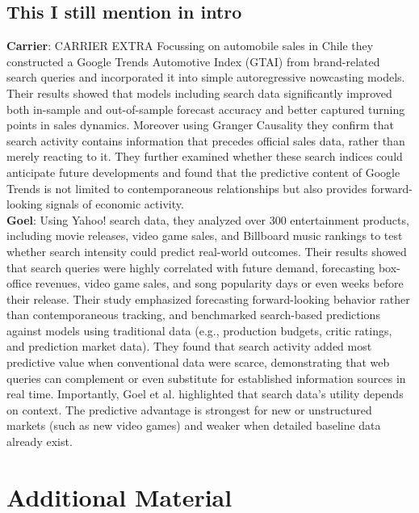 \documentclass[12pt,a4paper]{article}
\begin{document}
\subsection{This I still mention in intro}
\textbf{Carrier}: 
CARRIER EXTRA
Focussing on automobile sales in Chile they constructed a Google Trends Automotive Index (GTAI) from brand-related search queries and incorporated it into simple autoregressive nowcasting models.
Their results showed that models including search data significantly improved both in-sample and out-of-sample forecast accuracy and better captured turning points in sales dynamics.
Moreover using Granger Causality they confirm that search activity contains information that precedes official sales data, rather than merely reacting to it. They further examined whether these search indices could anticipate future developments and found that the predictive content of Google Trends is not limited to contemporaneous relationships but also provides forward-looking signals of economic activity.\\
\textbf{Goel}: Using Yahoo! search data, they analyzed over 300 entertainment products, including movie releases, video game sales, and Billboard music rankings to test whether search intensity could predict real-world outcomes. Their results showed that search queries were highly correlated with future demand, forecasting box-office revenues, video game sales, and song popularity days or even weeks before their release.
Their study emphasized forecasting forward-looking behavior rather than contemporaneous tracking, and benchmarked search-based predictions against models using traditional data (e.g., production budgets, critic ratings, and prediction market data).
They found that search activity added most predictive value when conventional data were scarce, demonstrating that web queries can complement or even substitute for established information sources in real time. Importantly, Goel et al. highlighted that search data’s utility depends on context.
The predictive advantage is strongest for new or unstructured markets (such as new video games) and weaker when detailed baseline data already exist.


\printbibliography

\appendix
\section{Additional Material}
\end{document}
